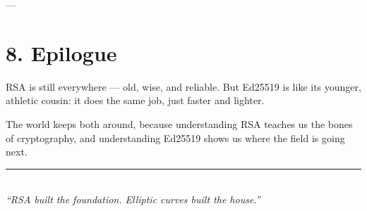 \documentclass[12pt]{article}
\begin{document}
---

\section*{8. Epilogue}

RSA is still everywhere — old, wise, and reliable.  
But Ed25519 is like its younger, athletic cousin:
it does the same job, just faster and lighter.

The world keeps both around, because understanding RSA teaches us the bones of cryptography,  
and understanding Ed25519 shows us where the field is going next.

\begin{center}
    \vspace{0.5em}
    \rule{0.7\textwidth}{0.5pt}\\[0.5em]
    \textit{“RSA built the foundation. Elliptic curves built the house.”}
\end{center}
\end{document}
